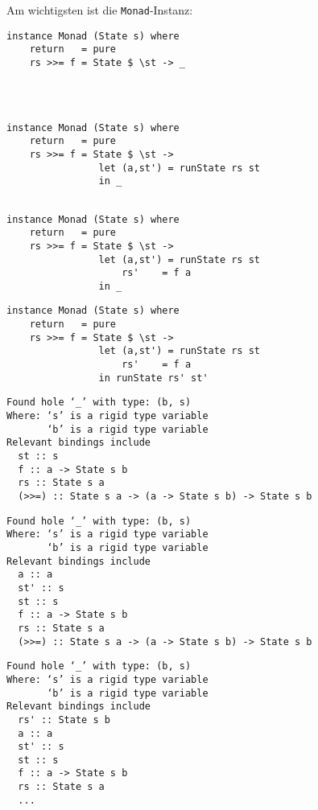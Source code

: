 \documentclass{beamer}
\begin{document}
\begin{frame}[fragile]
Am wichtigsten ist die \texttt{Monad}-Instanz:
\begin{overprint}
\begin{verbatim}
instance Monad (State s) where
    return   = pure
    rs >>= f = State $ \st -> _

    
    
\end{verbatim}
\begin{verbatim}
instance Monad (State s) where
    return   = pure
    rs >>= f = State $ \st ->
                let (a,st') = runState rs st
                in _
    
\end{verbatim}
\begin{verbatim}
instance Monad (State s) where
    return   = pure
    rs >>= f = State $ \st ->
                let (a,st') = runState rs st
                    rs'    = f a
                in _
\end{verbatim}
\begin{verbatim}
instance Monad (State s) where
    return   = pure
    rs >>= f = State $ \st ->
                let (a,st') = runState rs st
                    rs'    = f a
                in runState rs' st'
\end{verbatim}
\end{overprint}
\bigskip
\scriptsize
\begin{overprint}
\begin{verbatim}
Found hole ‘_’ with type: (b, s)
Where: ‘s’ is a rigid type variable
       ‘b’ is a rigid type variable
Relevant bindings include
  st :: s
  f :: a -> State s b
  rs :: State s a
  (>>=) :: State s a -> (a -> State s b) -> State s b
\end{verbatim}
\begin{verbatim}
Found hole ‘_’ with type: (b, s)
Where: ‘s’ is a rigid type variable
       ‘b’ is a rigid type variable
Relevant bindings include
  a :: a
  st' :: s
  st :: s
  f :: a -> State s b
  rs :: State s a
  (>>=) :: State s a -> (a -> State s b) -> State s b
\end{verbatim}
\begin{verbatim}
Found hole ‘_’ with type: (b, s)
Where: ‘s’ is a rigid type variable
       ‘b’ is a rigid type variable
Relevant bindings include
  rs' :: State s b
  a :: a
  st' :: s
  st :: s
  f :: a -> State s b
  rs :: State s a
  ...
\end{verbatim}
\end{overprint}
\end{frame}
\end{document}

